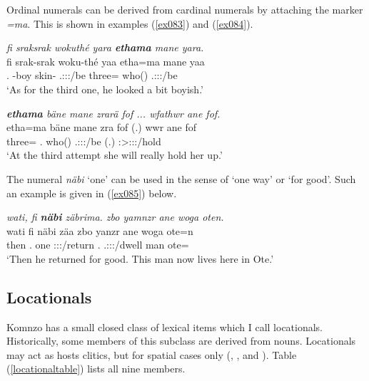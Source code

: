 Ordinal numerals can be derived from cardinal numerals by attaching the   marker \emph{=ma}. This is shown in examples (\ref{ex083}) and (\ref{ex084}).

\begin{exe}
	\ex \emph{fi sraksrak wokuthé yara \textbf{ethama} mane yara.}\\
	\gll fi srak-srak woku-thé yaa etha=ma mane yaa\\
	\Third.\Abs{} \Redup{}-boy skin-\Adlzr{} \Tsg.\Masc:\Sbj:\Pst:\Ipfv/be three=\Char{} who(\Abs) \Tsg.\Masc:\Sbj:\Pst:\Ipfv/be\\
	\trans `As for the third one, he looked a bit boyish.'
	\label{ex083}
\end{exe}
\begin{exe}
	\ex \emph{\textbf{ethama} bäne mane zrarä fof ... wfathwr ane fof.}\\
	\gll etha=ma bäne mane zra fof (.) wwr ane fof\\
	three=\Char{} \Recog.\Abs{} who(\Abs) \Tsg{}.\F:\Sbj:\Irr{}:\Ipfv{}/be \Emph{} (.) \Stsg{}:\Sbj{}>\Tsg{}\F{}:\Obj{}:\Nonpast{}:\Ipfv/hold \Dem{} \Emph{}\\
	\trans `At the third attempt she will really hold her up.'
	\label{ex084}
\end{exe}

The numeral \emph{näbi} `one' can be used in the sense of `one way' or `for good'. Such an example is given in (\ref{ex085}) below.

\begin{exe}
	\ex \emph{wati, fi \textbf{näbi} zäbrima. zbo yamnzr ane woga oten.}\\
	\gll wati fi näbi zäa zbo yanzr ane woga ote=n\\
	then \Third.\Abs{} one \Sg:\Sbj:\Pst:\Pfv/return \Prox{}.\All{} \Tsg{}.\Masc:\Sbj:\Nonpast:\Ipfv/dwell \Dem{} man ote=\Loc\\
	\trans `Then he returned for good. This man now lives here in Ote.'\\
	\label{ex085}
\end{exe}

\subsection{Locationals} \label{locationals}

Komnzo has a small closed class of lexical items which I call locationals. Historically, some members of this subclass are derived from nouns. Locationals may act as hosts  clitics, but for spatial cases only (, , and ). Table (\ref{locationaltable}) lists all nine members.

